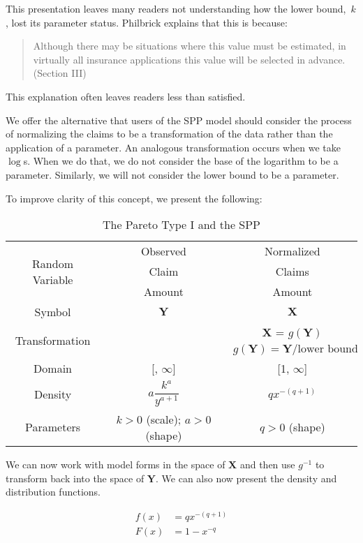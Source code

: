 \documentclass[]{article} %
\begin{document}
This presentation leaves many readers not understanding how the lower bound,~$k$,  lost its parameter status. Philbrick explains that this is because:
\begin{quote}
	Although there may be situations where this value must	be estimated, in virtually all insurance applications this value will be selected in advance. (Section III)
\end{quote}
This explanation often leaves readers less than satisfied.

We offer the alternative that users of the SPP model should consider the process of normalizing the claims to be a transformation of the data rather than the application of a parameter. An analogous transformation occurs when we take $\log$s. When we do that, we do not consider the base of the logarithm to be a parameter. Similarly, we will not consider the lower bound to be a parameter.

To improve clarity of this concept, we present the following:

\begin{table}[h!]
	\centering
	\begin{tabular}[h]{ccc}
		\toprule
		\multirow{3}{*}{Random Variable}& Observed & Normalized\\
		& Claim & Claims\\
		& Amount & Amount \\ \midrule
		Symbol & $\mathbf{Y}$ & $\mathbf{X}$\\ \midrule
		\multirow{2}{*}{Transformation} & & $\mathbf{X}$  =  $g(\mathbf{Y})$\\
		& & $g(\mathbf{Y}) =   \mathbf{Y}/\text{lower bound}$  \\ \midrule
		Domain & [\text{lower bound}, $\infty$] & [1, $\infty$]\\ \midrule
		Density & $a \dfrac{k^a}{y^{a+1}}$ & $qx^{-(q+1)}$\\ \midrule
		Parameters & $k>0$ (scale); $a>0$ (shape)& $q>0$ (shape)\\ 
	\bottomrule
	\end{tabular}
	\caption{The Pareto Type I and the SPP}\label{tbl:PIvSpp}			
\end{table}
We can now work with model forms in the space of $\mathbf{X}$ and then use $g^{-1}$ to transform back into the space of $\mathbf{Y}$. We can also now present the density and distribution functions.

\begin{align}
		f(x) & =  qx^{-(q+1)}\label{SPPf}\\
		F(x) & =  1 - x^{-q}\label{SPPF}
\end{align}
\end{document}
